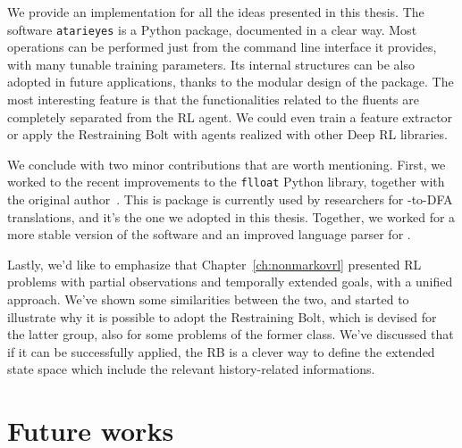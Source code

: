 \begin{description}[style=nextline]
	\item[The \texttt{atarieyes} package]
		We provide an implementation for all the ideas presented in this thesis.
		The software \texttt{atarieyes} is a Python package, documented in a clear
		way.  Most operations can be performed just from the command line
		interface it provides, with many tunable training parameters. Its internal
		structures can be also adopted in future applications, thanks to the
		modular design of the package. The most interesting feature is that the
		functionalities related to the fluents are completely separated from the
		RL agent. We could even train a feature extractor or apply the Restraining
		Bolt with agents realized with other Deep RL libraries.

\end{description}

We conclude with two minor contributions that are worth mentioning. First, we
worked to the recent improvements to the \texttt{flloat} Python library,
together with the original author~\cite{bib:favorito-thesis}. This is package
is currently used by researchers for \ldl{}-to-DFA translations, and it's the
one we adopted in this thesis. Together, we worked for a more stable version
of the software and an improved language parser for \ldl{}.

Lastly, we'd like to emphasize that Chapter~\ref{ch:nonmarkovrl} presented RL
problems with partial observations and temporally extended goals, with a
unified approach. We've shown some similarities between the two, and started
to illustrate why it is possible to adopt the Restraining Bolt, which is
devised for the latter group, also for some problems of the former class.
We've discussed that if it can be successfully applied, the RB is a clever way
to define the extended state space which include the relevant history-related
informations.


\section{Future works}

\label{sec:future}

